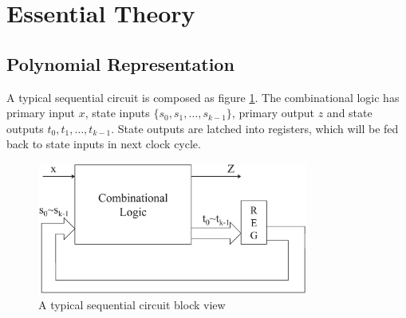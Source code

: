
\section{Essential Theory}
\subsection{Polynomial Representation}
A typical sequential circuit is composed as figure \ref{fig:sequential}. The combinational logic has primary input $x$, state
inputs $\{s_0, s_1, \dots, s_{k-1}\}$, primary output $z$ and state outputs $t_0, t_1, \dots, t_{k-1}$. State outputs
are latched into registers, which will be fed back to state inputs in next clock cycle.

\begin{figure}[tb]
\begin{center}
\includegraphics[width=3.5in]{./sequential_fig.eps}

\end{center}
\caption{A typical sequential circuit block view}
\label{fig:sequential}
\end{figure}


